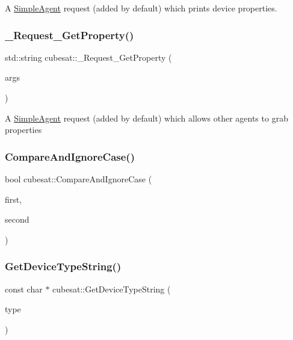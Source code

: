 A \hyperlink{classcubesat_1_1SimpleAgent}{Simple\+Agent} request (added by default) which prints device properties. 

\mbox{\label{namespacecubesat_a86fef60e77fb4edbec3c5bd8f99132b4}} 
\subsubsection{\texorpdfstring{\+\_\+\+Request\+\_\+\+Get\+Property()}{\_Request\_GetProperty()}}
{\footnotesize\ttfamily std\+::string cubesat\+::\+\_\+\+Request\+\_\+\+Get\+Property (\begin{DoxyParamCaption}\item[{std\+::vector$<$ std\+::string $>$}]{args }\end{DoxyParamCaption})}

A \hyperlink{classcubesat_1_1SimpleAgent}{Simple\+Agent} request (added by default) which allows other agents to grab properties \mbox{\label{namespacecubesat_aa791d6ee55d1ed9d85aa2b8c88ae9a9a}} 
\subsubsection{\texorpdfstring{Compare\+And\+Ignore\+Case()}{CompareAndIgnoreCase()}}
{\footnotesize\ttfamily bool cubesat\+::\+Compare\+And\+Ignore\+Case (\begin{DoxyParamCaption}\item[{const std\+::string \&}]{first,  }\item[{const std\+::string \&}]{second }\end{DoxyParamCaption})\hspace{0.3cm}{\ttfamily [inline]}}

\mbox{\label{namespacecubesat_a81f456d1c4c1074ce18ac724303763bc}} 
\subsubsection{\texorpdfstring{Get\+Device\+Type\+String()}{GetDeviceTypeString()}}
{\footnotesize\ttfamily const char $\ast$ cubesat\+::\+Get\+Device\+Type\+String (\begin{DoxyParamCaption}\item[{Device\+Type}]{type }\end{DoxyParamCaption})}

